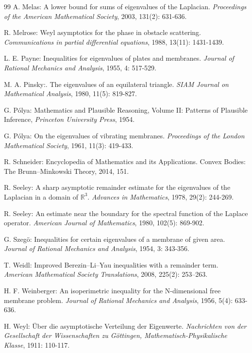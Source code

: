 \documentclass[11pt,letterpaper]{amsart}
\numberwithin{equation}{section}
\theoremstyle{plain}
\theoremstyle{plain}
\numberwithin{equation}{section}
\theoremstyle{remark}
\begin{document}
\begin{thebibliography}{99}
	A. Melas: A lower bound for sums of eigenvalues of the Laplacian. \emph{Proceedings of the American Mathematical Society}, 2003, 131(2): 631-636.
	
	R. Melrose: Weyl asymptotics for the phase in obstacle scattering. \emph{Communications in partial differential equations}, 1988, 13(11): 1431-1439.
	
	L. E. Payne: Inequalities for eigenvalues of plates and membranes. \emph{Journal of Rational Mechanics and Analysis}, 1955, 4: 517-529.
	
	M. A. Pinsky:. The eigenvalues of an equilateral triangle. \emph{SIAM Journal on Mathematical Analysis}, 1980, 11(5): 819-827.
	
	G. P\'olya: Mathematics and Plausible Reasoning, Volume II: Patterns of Plausible Inference, \emph{Princeton University Press}, 1954.
	
	G. P\'olya: On the eigenvalues of vibrating membranes. \emph{Proceedings of the London Mathematical Society}, 1961, 11(3): 419-433.
	
	R. Schneider: Encyclopedia of Mathematics and its Applications. Convex Bodies: The Brunn–Minkowski Theory, 2014, 151.
	
	
	R. Seeley: A sharp asymptotic remainder estimate for the eigenvalues of the Laplacian in a domain of $\mathbb{R}^3$. \emph{Advances in Mathematics}, 1978, 29(2): 244-269.
	
	R. Seeley: An estimate near the boundary for the spectral function of the Laplace operator. \emph{American Journal of Mathematics}, 1980, 102(5): 869-902.
	
	G. Szeg\"o: Inequalities for certain eigenvalues of a membrane of given area. \emph{Journal of Rational Mechanics and Analysis}, 1954, 3: 343-356.
	
	T. Weidl: Improved Berezin–Li–Yau inequalities with a remainder term. \emph{American Mathematical Society Translations}, 2008, 225(2): 253–263.
	
	H. F. Weinberger: An isoperimetric inequality for the N-dimensional free membrane problem. \emph{Journal of Rational Mechanics and Analysis}, 1956, 5(4): 633-636.
	
	H. Weyl: \"Uber die asymptotische Verteilung der Eigenwerte. \emph{Nachrichten von der Gesellschaft der Wissenschaften zu G\"ottingen, Mathematisch-Physikalische Klasse}, 1911: 110-117.	
\end{thebibliography}
\end{document}
